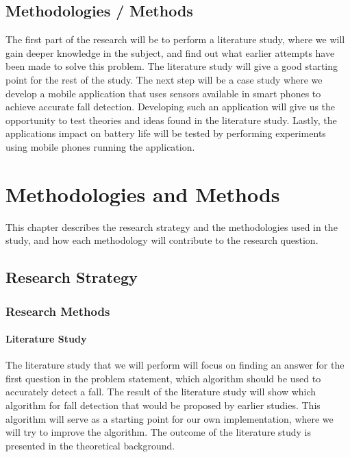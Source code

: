 \documentclass[12pt, a4paper, onecolumn]{article}
\begin{document}
	
\subsection{Methodologies / Methods}

The first part of the research will be to perform a literature study, where we will gain deeper knowledge in the subject, and find out what earlier attempts have been made to solve this problem. The literature study will give a good starting point for the rest of the study. The next step will be a case study where we develop a mobile application that uses sensors available in smart phones to achieve accurate fall detection. Developing such an application will give us the opportunity to test theories and ideas found in the literature study. Lastly, the applications impact on battery life will be tested by performing experiments using mobile phones running the application.   

\section{Methodologies and Methods}

This chapter describes the research strategy and the methodologies used in the study, and how each methodology will contribute to the research question.

\subsection{Research Strategy}



\subsubsection{Research Methods}

\paragraph{Literature Study}
The literature study that we will perform will focus on finding an answer for the first question in the problem statement, which algorithm should be used to accurately detect a fall. The result of the literature study will show which algorithm for fall detection that would be proposed by earlier studies. This algorithm will serve as a starting point for our own implementation, where we will try to improve the algorithm. The outcome of the literature study is presented in the theoretical background.
\end{document}
